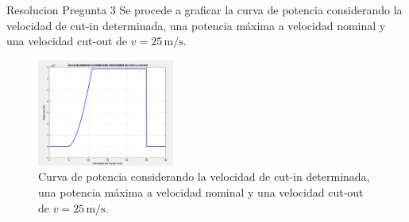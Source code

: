 \documentclass[
    10pt,
    aspectratio=169,
    xcolor={dvipsnames},
    spanish,
    ]{beamer}
\begin{document}
\begin{frame}
  \begin{block}{Resolucion Pregunta 3}
    Se procede a graficar la curva de potencia considerando la velocidad de cut-in determinada, una potencia máxima a velocidad nominal y una velocidad cut-out de \( v = 25 \, \text{m/s} \).
    \begin{figure}
      \centering
      \includegraphics[width=0.4\textwidth]{Figure_11.png}
      \caption{Curva de potencia considerando la velocidad de cut-in determinada, una potencia máxima a velocidad nominal y una velocidad cut-out de \( v = 25 \, \text{m/s} \).}
    \end{figure}
  \end{block}
\end{frame}
\end{document}
